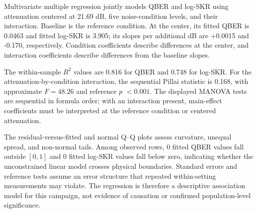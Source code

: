 Multivariate multiple regression jointly models QBER and log-SKR using attenuation centered at 21.69 dB, five noise-condition levels, and their interaction. Baseline is the reference condition. At the center, its fitted QBER is 0.0463 and fitted log-SKR is 3.905; its slopes per additional dB are +0.0015 and -0.170, respectively. Condition coefficients describe differences at the center, and interaction coefficients describe differences from the baseline slopes.

The within-sample $R^2$ values are 0.816 for QBER and 0.748 for log-SKR. For the attenuation-by-condition interaction, the sequential Pillai statistic is 0.168, with approximate $F=48.26$ and reference $p$ $<0.001$. The displayed MANOVA tests are sequential in formula order; with an interaction present, main-effect coefficients must be interpreted at the reference condition or centered attenuation.

The residual-versus-fitted and normal Q--Q plots assess curvature, unequal spread, and non-normal tails. Among observed rows, 0 fitted QBER values fall outside $[0,1]$ and 0 fitted log-SKR values fall below zero, indicating whether the unconstrained linear model crosses physical boundaries. Standard errors and reference tests assume an error structure that repeated within-setting measurements may violate. The regression is therefore a descriptive association model for this campaign, not evidence of causation or confirmed population-level significance.
